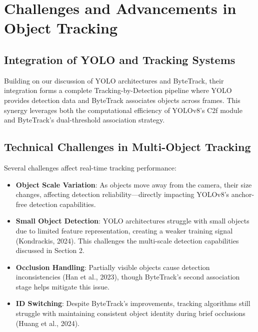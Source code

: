 \documentclass[11pt]{article}
\begin{document}


\section{Challenges and Advancements in Object Tracking}

\subsection{Integration of YOLO and Tracking Systems}
Building on our discussion of YOLO architectures and ByteTrack, their integration forms a complete Tracking-by-Detection pipeline where YOLO provides detection data and ByteTrack associates objects across frames. This synergy leverages both the computational efficiency of YOLOv8's C2f module and ByteTrack's dual-threshold association strategy.

\subsection{Technical Challenges in Multi-Object Tracking}
Several challenges affect real-time tracking performance:

\begin{itemize}
    \item \textbf{Object Scale Variation}: As objects move away from the camera, their size changes, affecting detection reliability—directly impacting YOLOv8's anchor-free detection capabilities.
    
    \item \textbf{Small Object Detection}: YOLO architectures struggle with small objects due to limited feature representation, creating a weaker training signal (Kondrackis, 2024). This challenges the multi-scale detection capabilities discussed in Section 2.
    
    \item \textbf{Occlusion Handling}: Partially visible objects cause detection inconsistencies (Han et al., 2023), though ByteTrack's second association stage helps mitigate this issue.
    
    \item \textbf{ID Switching}: Despite ByteTrack's improvements, tracking algorithms still struggle with maintaining consistent object identity during brief occlusions (Huang et al., 2024).
\end{itemize}
\end{document}
